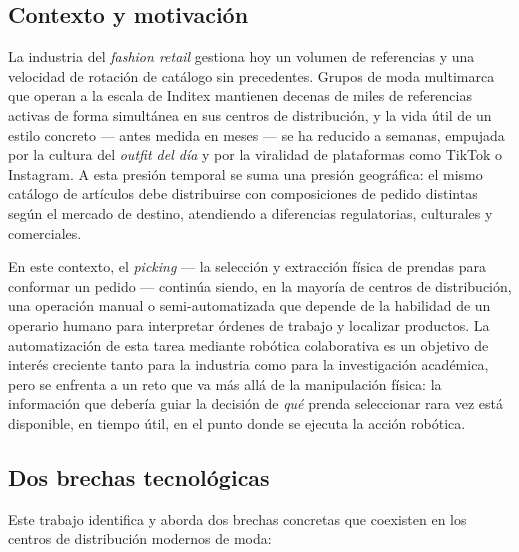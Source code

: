\documentclass[conference]{IEEEtran}
\begin{document}
\subsection{Contexto y motivación}

La industria del \emph{fashion retail} gestiona hoy un volumen de referencias
y una velocidad de rotación de catálogo sin precedentes. Grupos de moda
multimarca que operan a la escala de Inditex mantienen decenas de miles de
referencias activas de forma simultánea en sus centros de distribución, y la
vida útil de un estilo concreto --- antes medida en meses --- se ha reducido a
semanas, empujada por la cultura del \emph{outfit del día} y por la viralidad
de plataformas como TikTok o Instagram. A esta presión temporal se suma una
presión geográfica: el mismo catálogo de artículos debe distribuirse con
composiciones de pedido distintas según el mercado de destino, atendiendo a
diferencias regulatorias, culturales y comerciales.

En este contexto, el \emph{picking} --- la selección y extracción física de
prendas para conformar un pedido --- continúa siendo, en la mayoría de
centros de distribución, una operación manual o semi-automatizada que
depende de la habilidad de un operario humano para interpretar órdenes de
trabajo y localizar productos. La automatización de esta tarea mediante
robótica colaborativa es un objetivo de interés creciente tanto para la
industria como para la investigación académica, pero se enfrenta a un reto
que va más allá de la manipulación física: la información que debería guiar
la decisión de \emph{qué} prenda seleccionar rara vez está disponible, en
tiempo útil, en el punto donde se ejecuta la acción robótica.

\subsection{Dos brechas tecnológicas}

Este trabajo identifica y aborda dos brechas concretas que coexisten en los
centros de distribución modernos de moda:
\end{document}
